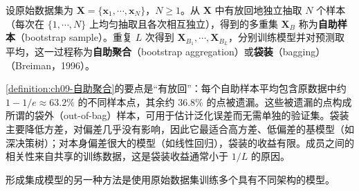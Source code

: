 \documentclass[../../main.tex]{subfiles}
\begin{document}
\begin{definition}[自助聚合与袋装]\label{definition:ch09-自助聚合}
设原始数据集为 $\boldsymbol{X}=\{\boldsymbol{x}_{1},\cdots,\boldsymbol{x}_{N}\}$，$N\geqslant1$。从 $\boldsymbol{X}$ 中有放回地独立抽取 $N$ 个样本（每次在 $\{1,\cdots,N\}$ 上均匀抽取且各次相互独立），得到的多重集 $\boldsymbol{X}_{B}$ 称为\textbf{自助样本}（bootstrap sample）。重复 $L$ 次得到 $\boldsymbol{X}_{B_{1}},\cdots,\boldsymbol{X}_{B_{L}}$，分别训练模型并对预测取平均，这一过程称为\textbf{自助聚合}（bootstrap aggregation）或\textbf{袋装}（bagging）（Breiman，1996）。
\end{definition}

\begin{remark}\cref{definition:ch09-自助聚合}的要点是“有放回”：每个自助样本平均包含原数据中约 $1-1/e\approx63.2\%$ 的不同样本点，其余约 $36.8\%$ 的点被遗漏。这些被遗漏的点构成所谓的袋外（out-of-bag）样本，可用于估计泛化误差而无需单独的验证集。袋装主要降低方差，对偏差几乎没有影响，因此它最适合高方差、低偏差的基模型（如深决策树）；对本身偏差很大的模型（如线性回归），袋装的收益有限。成员之间的相关性来自共享的训练数据，这是袋装收益通常小于 $1/L$ 的原因。
\end{remark}

形成集成模型的另一种方法是使用原始数据集训练多个具有不同架构的模型。
\end{document}

